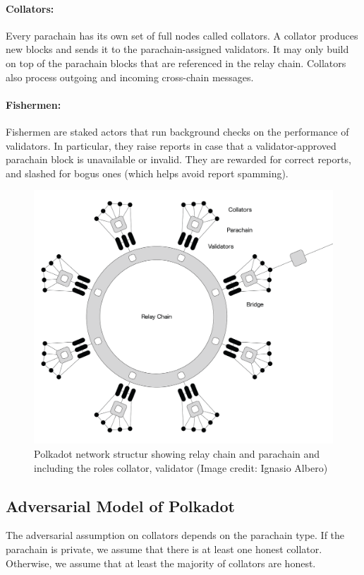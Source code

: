 \paragraph{Collators: } Every parachain has its own set of full nodes called collators.
A collator produces new blocks and sends it to the parachain-assigned validators.
It may only build on top of the parachain blocks that are referenced in the relay chain.
Collators also process outgoing and incoming cross-chain messages.

\paragraph{Fishermen:} Fishermen are staked actors that run background checks on the performance of validators.
In particular, they raise reports in case that a validator-approved parachain block is unavailable or invalid.
They are rewarded for correct reports, and slashed for bogus ones (which helps avoid report spamming).


\begin{figure}[h]
	\centering
	\includegraphics[width=.7\textwidth]{images/Network@2x.png}
	\caption{Polkadot network structur showing relay chain and parachain and including the roles collator, validator (Image credit: Ignasio Albero)}
	\label{fig:roles}
\end{figure}

\subsection{Adversarial Model of Polkadot}

The adversarial assumption on collators depends on the parachain type. If the parachain is private,
we assume that there is at least one honest collator.
Otherwise, we assume that at least the majority of collators are honest.

